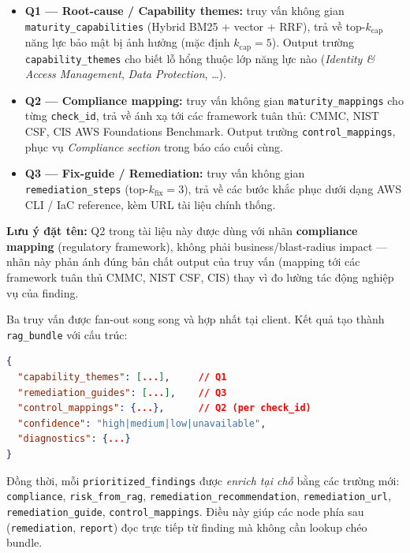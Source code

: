 \begin{itemize}
  \item \textbf{Q1 --- Root-cause / Capability themes:} truy vấn không gian \texttt{maturity\_capabilities} (Hybrid BM25 + vector + RRF), trả về top-$k_{\text{cap}}$ năng lực bảo mật bị ảnh hưởng (mặc định $k_{\text{cap}}=5$). Output trường \texttt{capability\_themes} cho biết lỗ hổng thuộc lớp năng lực nào (\textit{Identity \& Access Management}, \textit{Data Protection}, \ldots).
  \item \textbf{Q2 --- Compliance mapping:} truy vấn không gian \texttt{maturity\_mappings} cho từng \texttt{check\_id}, trả về ánh xạ tới các framework tuân thủ: CMMC, NIST CSF, CIS AWS Foundations Benchmark. Output trường \texttt{control\_mappings}, phục vụ \textit{Compliance section} trong báo cáo cuối cùng.
  \item \textbf{Q3 --- Fix-guide / Remediation:} truy vấn không gian \texttt{remediation\_steps} (top-$k_{\text{fix}}=3$), trả về các bước khắc phục dưới dạng AWS CLI / IaC reference, kèm URL tài liệu chính thống.
\end{itemize}

\textbf{Lưu ý đặt tên:} Q2 trong tài liệu này được dùng với nhãn \textbf{compliance mapping} (regulatory framework), không phải business/blast-radius impact --- nhãn này phản ánh đúng bản chất output của truy vấn (mapping tới các framework tuân thủ CMMC, NIST CSF, CIS) thay vì đo lường tác động nghiệp vụ của finding.

Ba truy vấn được fan-out song song và hợp nhất tại client. Kết quả tạo thành \texttt{rag\_bundle} với cấu trúc:

\begin{lstlisting}[language=json,caption={Cấu trúc rag\_bundle persist trong PDCAState},label={lst:rag_bundle}]
{
  "capability_themes": [...],     // Q1
  "remediation_guides": [...],    // Q3
  "control_mappings": {...},      // Q2 (per check_id)
  "confidence": "high|medium|low|unavailable",
  "diagnostics": {...}
}
\end{lstlisting}

Đồng thời, mỗi \texttt{prioritized\_findings} được \textit{enrich tại chỗ} bằng các trường mới: \texttt{compliance}, \texttt{risk\_from\_rag}, \texttt{remediation\_recommendation}, \texttt{remediation\_url}, \texttt{remediation\_guide}, \texttt{control\_mappings}. Điều này giúp các node phía sau (\texttt{remediation}, \texttt{report}) đọc trực tiếp từ finding mà không cần lookup chéo bundle.

